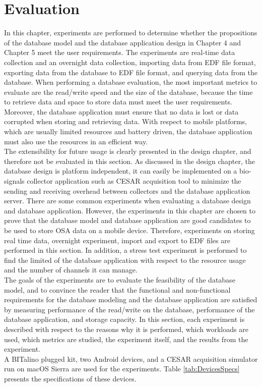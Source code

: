 
\chapter{Evaluation}%

\label{Chapter6} %
In this chapter, experiments are performed to determine whether the propositions of the database model and the database application design in Chapter 4 and Chapter 5 meet the user requirements. The experiments are real-time data collection and an overnight data collection, importing data from EDF file format, exporting data from the database to EDF file format, and querying data from the database. When performing a database evaluation, the most important metrics to evaluate are the read/write speed and the size of the database, because the time to retrieve data and space to store data must meet the user requirements. Moreover, the database application must ensure that no data is lost or data corrupted when storing and retrieving data. With respect to mobile platforms, which are usually limited resources and battery driven, the database application must also use the resources in an efficient way.\\
The extensibility for future usage is clearly presented in the design chapter, and therefore not be evaluated in this section. As discussed in the design chapter, the database design is platform independent, it can easily be implemented on a bio-signals collector application such as CESAR acquisition tool to minimize the sending and receiving overhead between collectors and the database application server. There are some common experiments when evaluating a database design and database application. However, the experiments in this chapter are chosen to prove that the database model and database application are good candidates to be used to store OSA data on a mobile device. Therefore, experiments on storing real time data, overnight experiment, import and export to EDF files are performed in this section. In addition, a stress test experiment is performed to find the limited of the database application with respect to the resource usage and the number of channels it can manage.\\
The goals of the experiments are to evaluate the feasibility of the database model, and to convince the reader that the functional and non-functional requirements for the database modeling and the database application are satisfied by measuring performance of the read/write on the database, performance of the database application, and storage capacity. In this section, each experiment is described with respect to the reasons why it is performed, which workloads are used, which metrics are studied, the experiment itself, and the results from the experiment.\\
A BITalino plugged kit, two Android devices, and a CESAR acquisition simulator run on macOS Sierra are used for the experiments. Table \ref{tab:DevicesSpecs} presents the specifications of these devices.
